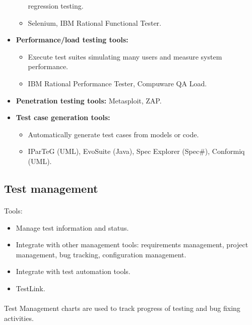 \documentclass[../ESOF_notes.tex]{subfiles}
\begin{document}
\begin{itemize}
\begin{itemize}
            regression testing.
            \item Selenium, IBM Rational Functional Tester.
        \end{itemize}
        \item \textbf{Performance/load testing tools:}
        \begin{itemize}
            \item Execute test suites simulating many users
            and measure system performance.
            \item IBM Rational Performance Tester, Compuware QA Load.
        \end{itemize}
        \item \textbf{Penetration testing tools:} Metasploit, ZAP.
        \item \textbf{Test case generation tools:}
        \begin{itemize}
            \item Automatically generate test cases from 
            models or code.
            \item IParTeG (UML), EvoSuite (Java), Spec Explorer (Spec\#),
             Conformiq (UML).
        \end{itemize}
    \end{itemize}
    \subsection{Test management}
    \paragraph{}
    Tools:
    \begin{itemize}
        \item Manage test information and status.
        \item Integrate with other management tools: 
        requirements management, project management, 
        bug tracking, configuration management.
        \item Integrate with test automation tools.
        \item TestLink.
    \end{itemize}
    \paragraph{}
    Test Management charts are used to track progress 
    of testing and bug fixing activities.
\end{document}
